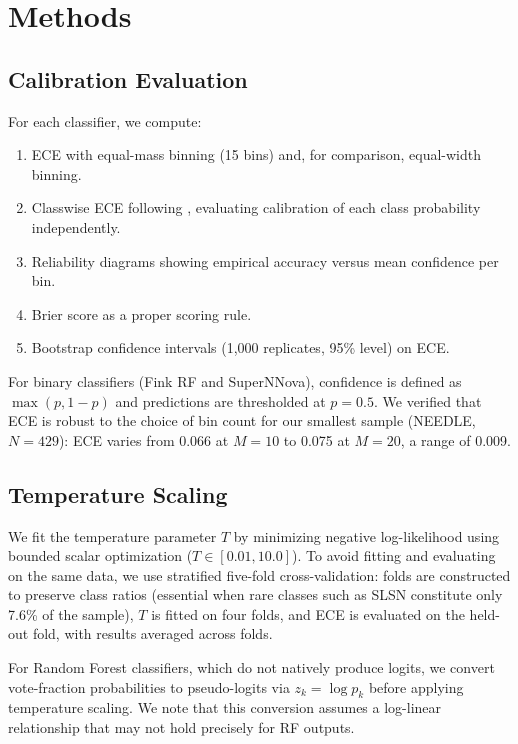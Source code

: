 \documentclass[twocolumn]{aastex631}
\begin{document}
\section{Methods} \label{sec:methods}

\subsection{Calibration Evaluation}

For each classifier, we compute:
\begin{enumerate}
    \item ECE with equal-mass binning (15 bins) and, for comparison, equal-width binning.
    \item Classwise ECE following \citet{nixon2019}, evaluating calibration of each class probability independently.
    \item Reliability diagrams showing empirical accuracy versus mean confidence per bin.
    \item Brier score as a proper scoring rule.
    \item Bootstrap confidence intervals (1,000 replicates, 95\% level) on ECE.
\end{enumerate}

For binary classifiers (Fink RF and SuperNNova), confidence is defined as $\max(p, 1-p)$ and predictions are thresholded at $p = 0.5$. We verified that ECE is robust to the choice of bin count for our smallest sample (NEEDLE, $N = 429$): ECE varies from 0.066 at $M = 10$ to 0.075 at $M = 20$, a range of 0.009.

\subsection{Temperature Scaling}

We fit the temperature parameter $T$ by minimizing negative log-likelihood using bounded scalar optimization ($T \in [0.01, 10.0]$). To avoid fitting and evaluating on the same data, we use stratified five-fold cross-validation: folds are constructed to preserve class ratios (essential when rare classes such as SLSN constitute only 7.6\% of the sample), $T$ is fitted on four folds, and ECE is evaluated on the held-out fold, with results averaged across folds.

For Random Forest classifiers, which do not natively produce logits, we convert vote-fraction probabilities to pseudo-logits via $z_k = \log p_k$ before applying temperature scaling. We note that this conversion assumes a log-linear relationship that may not hold precisely for RF outputs.
\end{document}
